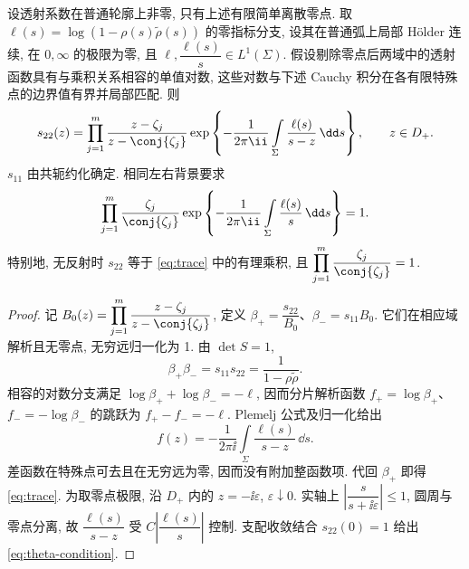 \begin{proposition}[迹公式与同相约束]\label{prop:theta}
设透射系数在普通轮廓上非零, 只有上述有限简单离散零点. 取
$\ell(s)=\log(1-\rho(s)\widetilde\rho(s))$ 的零指标分支, 设其在普通弧上局部 Hölder 连续, 在 $0,\infty$ 的极限为零, 且 $\ell,\dfrac{\ell(s)}{s}\in L^1(\Sigma)$. 假设剔除零点后两域中的透射函数具有与乘积关系相容的单值对数, 这些对数与下述 Cauchy 积分在各有限特殊点的边界值有界并局部匹配. 则
\begin{equation}\label{eq:trace}
s_{22}(z)=\prod_{j=1}^{m}\dfrac{z-\zeta_j}{z-\conj{\zeta_j}}
\exp\left\{-\dfrac{1}{2\pi\ii}\int\limits_\Sigma\dfrac{\ell(s)}{s-z}\,\dd s\right\},\qquad z\in D_+.
\end{equation}
$s_{11}$ 由共轭约化确定. 相同左右背景要求
\begin{equation}\label{eq:theta-condition}
\prod_{j=1}^{m}\dfrac{\zeta_j}{\conj{\zeta_j}}
\exp\left\{-\dfrac{1}{2\pi\ii}\int\limits_\Sigma\dfrac{\ell(s)}{s}\,\dd s\right\}=1.
\end{equation}
特别地, 无反射时 $s_{22}$ 等于 \eqref{eq:trace} 中的有理乘积, 且 $\displaystyle\prod_{j=1}^{m}\dfrac{\zeta_j}{\conj{\zeta_j}}=1$.
\end{proposition}
\begin{proof}
记 $B_0(z)=\displaystyle\prod_{j=1}^{m}\dfrac{z-\zeta_j}{z-\conj{\zeta_j}}$, 定义
$\beta_+=\dfrac{s_{22}}{B_0}$、$\beta_-=s_{11}B_0$. 它们在相应域解析且无零点, 无穷远归一化为 1. 由 $\det S=1$,
\[
\beta_+\beta_-=s_{11}s_{22}=\dfrac{1}{1-\rho\widetilde\rho}.
\]
相容的对数分支满足 $\log\beta_++\log\beta_-=-\ell$, 因而分片解析函数 $f_+=\log\beta_+$、$f_-=-\log\beta_-$ 的跳跃为 $f_+-f_-=-\ell$. Plemelj 公式及归一化给出
\[
f(z)=-\dfrac{1}{2\pi\ii}\int\limits_\Sigma\dfrac{\ell(s)}{s-z}\,\dd s.
\]
差函数在特殊点可去且在无穷远为零, 因而没有附加整函数项. 代回 $\beta_+$ 即得 \eqref{eq:trace}. 为取零点极限, 沿 $D_+$ 内的 $z=-\ii\varepsilon$, $\varepsilon\downarrow0$. 实轴上 $\left|\dfrac{s}{s+\ii\varepsilon}\right|\le1$, 圆周与零点分离, 故 $\dfrac{\ell(s)}{s-z}$ 受 $C\left|\dfrac{\ell(s)}{s}\right|$ 控制. 支配收敛结合 $s_{22}(0)=1$ 给出 \eqref{eq:theta-condition}.
\end{proof}

